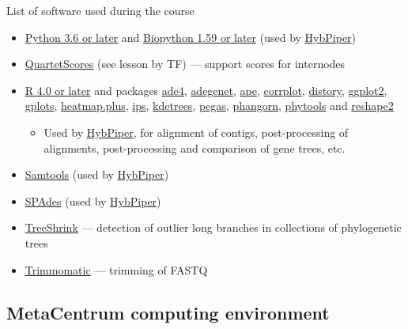 \documentclass[compress, ucs, xelatex, 11pt, xcolor=x11names, aspectratio=169,
	hyperref={
		bookmarks=true,
		unicode=true,
		colorlinks=true,
		pdftitle={HybSeq course},
		plainpages=false,
		pdfauthor={Vojtech Zeisek},
		pdfsubject={Practical processing of HybSeq target enrichment sequencing data on computing grids like MetaCentrum},
		pdfcreator={XeLaTeX},
		pdfkeywords={BASH, command line, GNU, HybSeq, Linux, MetaCentrum, sequencing shell, target enrichment},
		linkcolor=Turquoise4, %
		anchorcolor=DodgerBlue4, %
		citecolor=DodgerBlue4, %
		filecolor=DodgerBlue4, %
		menucolor=Tan4, %
		urlcolor=DarkOliveGreen4, %
		pdftex},
	url={hyphens, lowtilde} %
	]{beamer}
\begin{document}
\begin{frame}[allowframebreaks]{List of software used during the course}
\begin{itemize}
		\item \href{https://www.python.org/}{Python 3.6 or later} and \href{https://biopython.org/}{Biopython 1.59 or later} (used by \href{https://github.com/mossmatters/HybPiper/wiki}{HybPiper})
		\item \href{https://github.com/lutteropp/QuartetScores}{QuartetScores} (see lesson by TF) --- support scores for internodes
		\item \href{https://www.r-project.org/}{R 4.0 or later} and packages \href{https://cran.r-project.org/package=ade4}{ade4}, \href{https://cran.r-project.org/package=adegenet}{adegenet}, \href{https://cran.r-project.org/package=ape}{ape}, \href{https://cran.r-project.org/package=corrplot}{corrplot}, \href{https://cran.r-project.org/package=distory}{distory}, \href{https://cran.r-project.org/package=ggplot2}{ggplot2}, \href{https://cran.r-project.org/package=gplots}{gplots}, \href{https://cran.r-project.org/package=heatmap.plus}{heatmap.plus}, \href{https://cran.r-project.org/package=ips}{ips}, \href{https://cran.r-project.org/package=kdetrees}{kdetrees}, \href{https://cran.r-project.org/package=pegas}{pegas}, \href{https://cran.r-project.org/package=phangorn}{phangorn}, \href{https://cran.r-project.org/package=phytools}{phytools} and \href{https://cran.r-project.org/package=reshape2}{reshape2}
		\begin{itemize}
			\item Used by \href{https://github.com/mossmatters/HybPiper/wiki}{HybPiper}, for alignment of contigs, post-processing of alignments, post-processing and comparison of gene trees, etc.
		\end{itemize}
		\item \href{https://www.htslib.org/}{Samtools} (used by \href{https://github.com/mossmatters/HybPiper/wiki}{HybPiper})
		\item \href{https://github.com/ablab/spades}{SPAdes} (used by \href{https://github.com/mossmatters/HybPiper/wiki}{HybPiper})
		\item \href{https://github.com/uym2/TreeShrink}{TreeShrink} --- detection of outlier long branches in collections of phylogenetic trees
		\item \href{http://www.usadellab.org/cms/?page=trimmomatic}{Trimmomatic} --- trimming of FASTQ
	\end{itemize}
\end{frame}

\subsection{MetaCentrum computing environment}
\end{document}

